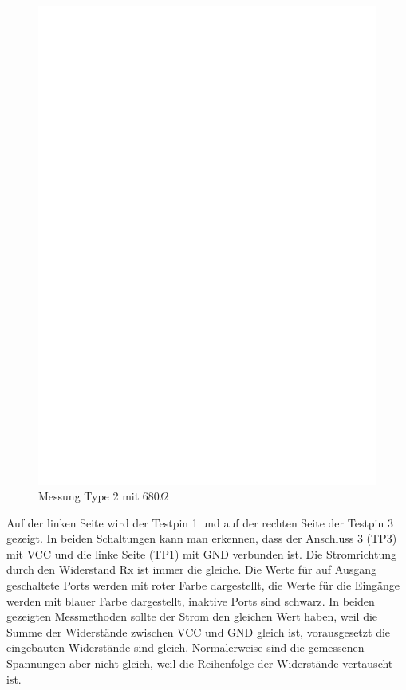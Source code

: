 \begin{figure}[H]
 \centering
 \includegraphics[]{../FIG/ResistormessL2.eps}
 \caption{Messung Type 2 mit \(680\Omega\) }
\label{fig:RL2mes}
\end{figure}

Auf der linken Seite wird der Testpin 1 und auf der rechten Seite der Testpin 3 gezeigt.
In beiden Schaltungen kann man erkennen, dass der Anschluss 3 (TP3) mit VCC und die linke Seite (TP1) mit
GND verbunden ist.
Die Stromrichtung durch den Widerstand Rx ist immer die gleiche.
Die Werte für auf Ausgang geschaltete Ports werden mit roter Farbe dargestellt, 
die Werte für die Eingänge werden mit blauer Farbe dargestellt, inaktive Ports sind schwarz.
In beiden gezeigten Messmethoden sollte der Strom den gleichen Wert haben, weil die Summe der Widerstände zwischen
VCC und GND gleich ist, vorausgesetzt die eingebauten Widerstände sind gleich.
Normalerweise sind die gemessenen Spannungen aber nicht gleich, weil die Reihenfolge
der Widerstände vertauscht ist.

